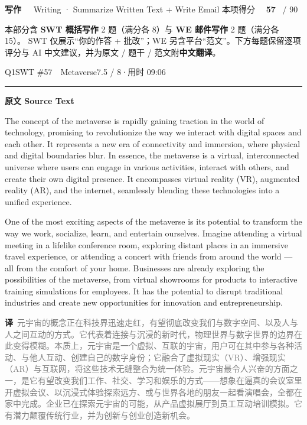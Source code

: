 \documentclass[11pt]{article}
\newcommand{\ptesub}[1]{%
  \par\needspace{2\baselineskip}\smallskip
  {\color{cAccent}\rule[-0.2ex]{3pt}{1.05em}}\hspace{6pt}%
  {\bfseries\color{cHead}#1}\par\nopagebreak\smallskip}
\newcommand{\ptesection}[3]{%
  \needspace{6\baselineskip}
  \begin{tcolorbox}[enhanced, colback=cAccent, colframe=cAccent, sharp corners,
     left=14pt, right=14pt, top=10pt, bottom=10pt, boxrule=0pt]
    {\fontsize{20}{24}\selectfont\bfseries\color{white} #1\ \ }%
    {\large\color{white!85} #2}\hfill
    {\large\color{white}本项得分\ \ }{\fontsize{22}{24}\selectfont\bfseries\color{white} #3}%
    \ {\color{white!85}/ 90}
  \end{tcolorbox}}
\newcommand{\zh}[1]{{\footnotesize\textcolor{cNote}{\textbf{译}}\ \textcolor{gray}{#1}}}
\begin{document}
\ptesection{写作}{Writing · Summarize Written Text + Write Email}{57}

\vspace{1mm}
{\small\color{gray} 本部分含 \textbf{SWT 概括写作} 2 题（满分各 8）与 \textbf{WE 邮件写作} 2 题（满分各 15）。
SWT 仅展示“你的作答 + 批改”；WE 另含平台“范文”。下方每题保留逐项评分与 AI 中文建议，并为原文 / 题干 / 范文附\textbf{中文翻译}。}
\vspace{2mm}


\begin{qblock}{Q1\quad SWT \#57\ \ Metaverse}{7.5 / 8\quad·\quad 用时 09:06}

\ptesub{原文 Source Text}
\begin{promptbox}
The concept of the metaverse is rapidly gaining traction in the world of technology, promising to revolutionize the way we interact with digital spaces and each other. It represents a new era of connectivity and immersion, where physical and digital boundaries blur. In essence, the metaverse is a virtual, interconnected universe where users can engage in various activities, interact with others, and create their own digital presence. It encompasses virtual reality (VR), augmented reality (AR), and the internet, seamlessly blending these technologies into a unified experience.

One of the most exciting aspects of the metaverse is its potential to transform the way we work, socialize, learn, and entertain ourselves. Imagine attending a virtual meeting in a lifelike conference room, exploring distant places in an immersive travel experience, or attending a concert with friends from around the world --- all from the comfort of your home. Businesses are already exploring the possibilities of the metaverse, from virtual showrooms for products to interactive training simulations for employees. It has the potential to disrupt traditional industries and create new opportunities for innovation and entrepreneurship.
\end{promptbox}
\zh{元宇宙的概念正在科技界迅速走红，有望彻底改变我们与数字空间、以及人与人之间互动的方式。它代表着连接与沉浸的新时代，物理世界与数字世界的边界在此变得模糊。本质上，元宇宙是一个虚拟、互联的宇宙，用户可在其中参与各种活动、与他人互动、创建自己的数字身份；它融合了虚拟现实（VR）、增强现实（AR）与互联网，将这些技术无缝整合为统一体验。元宇宙最令人兴奋的方面之一，是它有望改变我们工作、社交、学习和娱乐的方式——想象在逼真的会议室里开虚拟会议、以沉浸式体验探索远方、或与世界各地的朋友一起看演唱会，全都在家中完成。企业已在探索元宇宙的可能，从产品虚拟展厅到员工互动培训模拟。它有潜力颠覆传统行业，并为创新与创业创造新机会。}


\end{qblock}
\end{document}

